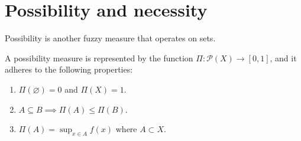 \section{Possibility and necessity}

\begin{definition}
    Possibility is another fuzzy measure that operates on sets. 
\end{definition}
A possibility measure is represented by the function $\Pi : \mathcal{P}(X) \rightarrow [0,1]$, and it adheres to the following properties:
\begin{enumerate}
    \item $\Pi(\varnothing)=0$ and $\Pi(X)=1$.
    \item $A \subseteq B \implies \Pi(A) \leq \Pi(B)$. 
    \item $\Pi(A)=\sup_{x \in A} f(x)$ where $A \subset X$. 
\end{enumerate}

